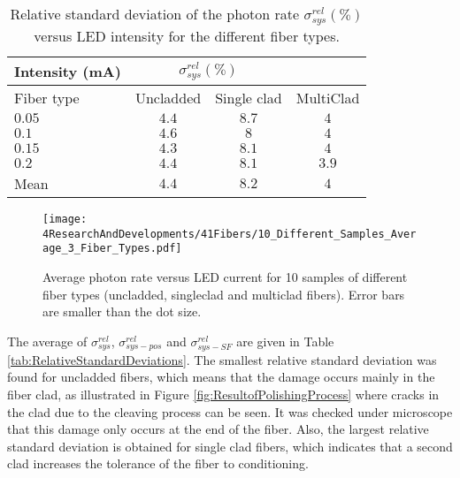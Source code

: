 \begin{table}[h]
\centering{}%
\begin{tabular}{lccc}
\toprule 
Intensity (mA) & \multicolumn{2}{c}{$\sigma^{rel}_{sys}(\%)$} \tabularnewline
\midrule
Fiber type & Uncladded & Single clad & MultiClad \tabularnewline
\midrule
\midrule
$0.05$ & $4.4$ & $8.7$ & $4$ \tabularnewline
$0.1$ & $4.6$ & $8$ & $4$ \tabularnewline
$0.15$ & $4.3$ & $8.1$ & $4$ \tabularnewline
$0.2$ & $4.4$ & $8.1$ & $3.9$ \tabularnewline
\midrule 
Mean & $4.4$ & $8.2$ & $4$ \tabularnewline
\bottomrule
\end{tabular}
\caption{Relative standard deviation of the photon rate $\sigma^{rel}_{sys}(\%)$ versus LED intensity for the different fiber types.}
\label{tab:RelativeStandardDeviation3FiberTypes}
\end{table}

\begin{figure}[h]
\centering
\texttt{[image: 4ResearchAndDevelopments/41Fibers/10\_Different\_Samples\_Average\_3\_Fiber\_Types.pdf]}
\caption{Average photon rate versus LED current for 10 samples of different fiber types (uncladded, singleclad and multiclad fibers). Error bars are smaller than the dot size.\label{fig:AveregeThreeFiberTypes}}
\end{figure}



The average of $\sigma^{rel}_{sys}$, $\sigma^{rel}_{sys-pos}$ and $\sigma^{rel}_{sys-SF}$ are given in Table \ref{tab:RelativeStandardDeviations}. The smallest relative standard deviation was found for uncladded fibers, which means that the damage occurs mainly in the fiber clad, as illustrated in Figure \ref{fig:ResultofPolishingProcess} where cracks in the clad due to the cleaving process can be seen. It was checked under microscope that this damage only occurs at the end of the fiber. Also, the largest relative standard deviation is obtained for single clad fibers, which indicates that a second clad increases the tolerance of the fiber to conditioning.

